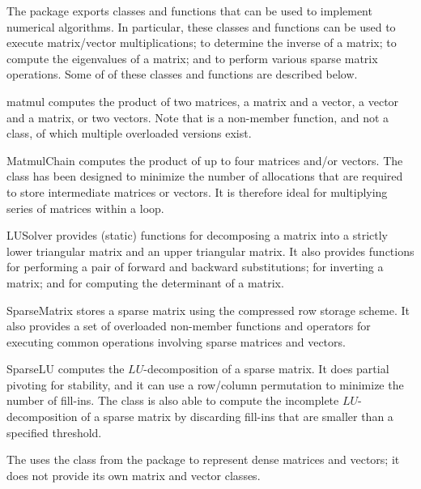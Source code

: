 \documentclass[a4paper,10pt]{article}
\begin{document}
The  package exports classes and functions that can be used
to implement numerical algorithms. In particular, these classes and
functions can be used to execute matrix/vector multiplications; to
determine the inverse of a matrix; to compute the eigenvalues of a
matrix; and to perform various sparse matrix operations. Some of of these
classes and functions are described below.
\begin{Description}[\Code]

\item[matmul] computes the product of two matrices, a matrix and a
  vector, a vector and a matrix, or two vectors. Note that 
  is a non-member function, and not a class, of which multiple overloaded
  versions exist.

\item[MatmulChain] computes the product of up to four matrices and/or
  vectors. The  class has been designed to minimize
  the number of allocations that are required to store intermediate
  matrices or vectors. It is therefore ideal for multiplying series of
  matrices within a loop.

\item[LUSolver] provides (static) functions for decomposing a matrix into
  a strictly lower triangular matrix and an upper triangular matrix. It
  also provides functions for performing a pair of forward and backward
  substitutions; for inverting a matrix; and for computing the
  determinant of a matrix.

\item[SparseMatrix] stores a sparse matrix using the compressed row
  storage scheme. It also provides a set of overloaded non-member
  functions and operators for executing common operations involving
  sparse matrices and vectors.

\item[SparseLU] computes the $LU$-decomposition of a sparse matrix. It
  does partial pivoting for stability, and it can use a row/column
  permutation to minimize the number of fill-ins. The 
  class is also able to compute the incomplete $LU$-decomposition of a
  sparse matrix by discarding fill-ins that are smaller than a specified
  threshold.

\end{Description}
The  uses the  class from the package
 to represent dense matrices and vectors; it does not provide
its own matrix and vector classes.
\end{document}
